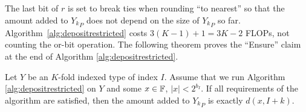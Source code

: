      The last bit of $r$ is set to break ties when rounding ``to nearest'' so
      that the amount added to ${Y_k}_P$ does not depend on the size of
      ${Y_k}_P$ so far.
      Algorithm~\ref{alg:depositrestricted} costs $3(K-1)+1=3K-2$ FLOPs,
      not counting the or-bit operation.
      The following theorem proves the ``Ensure'' claim at
      the end of Algorithm \ref{alg:depositrestricted}.

    \begin{samepage}
      \begin{thm}
        Let $Y$ be an $K$-fold indexed type of index $I$. Assume that we run
        Algorithm \ref{alg:depositrestricted} on $Y$ and some $x \in \mathbb{F}$, $|x|
        < 2^{b_I}$. If all requirements of the algorithm are satisfied, then
        the amount added to ${Y_k}_P$ is exactly $d(x, I + k)$.
        \label{thm:ddepositrestricted}
      \end{thm}
    \end{samepage}

